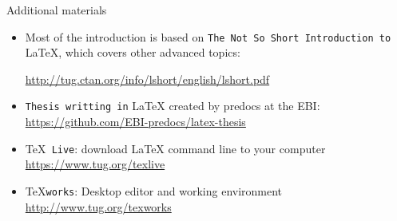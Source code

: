 \documentclass[inputenc]{beamer}
\begin{document}
\begin{frame}{Additional materials}

\begin{itemize}
    \item Most of the introduction is based on \texttt{The Not So Short Introduction to} \LaTeX{}, which covers other advanced topics:
    
    {\small\url{http://tug.ctan.org/info/lshort/english/lshort.pdf}}
    \item \texttt{Thesis writting in} \LaTeX{} created by predocs at the EBI: \url{https://github.com/EBI-predocs/latex-thesis}
    
    \item \TeX{}\texttt{ Live}: download \LaTeX{} command line to your computer \url{https://www.tug.org/texlive}
    
    \item \TeX{}\texttt{works}: Desktop editor and working environment \url{http://www.tug.org/texworks}
    
\end{itemize}

\end{frame}
\end{document}
